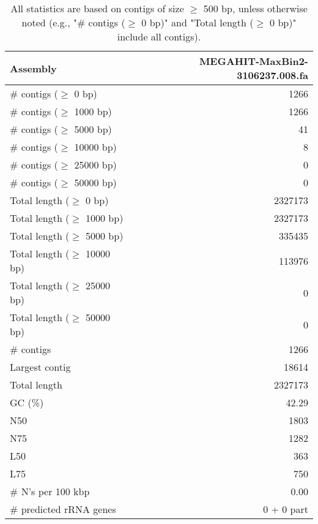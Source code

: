 \documentclass[12pt,a4paper]{article}
\begin{document}
\begin{table}[ht]
\begin{center}
\caption{All statistics are based on contigs of size $\geq$ 500 bp, unless otherwise noted (e.g., "\# contigs ($\geq$ 0 bp)" and "Total length ($\geq$ 0 bp)" include all contigs).}
\begin{tabular}{|l*{1}{|r}|}
\hline
Assembly & MEGAHIT-MaxBin2-3106237.008.fa \\ \hline
\# contigs ($\geq$ 0 bp) & 1266 \\ \hline
\# contigs ($\geq$ 1000 bp) & 1266 \\ \hline
\# contigs ($\geq$ 5000 bp) & 41 \\ \hline
\# contigs ($\geq$ 10000 bp) & 8 \\ \hline
\# contigs ($\geq$ 25000 bp) & 0 \\ \hline
\# contigs ($\geq$ 50000 bp) & 0 \\ \hline
Total length ($\geq$ 0 bp) & 2327173 \\ \hline
Total length ($\geq$ 1000 bp) & 2327173 \\ \hline
Total length ($\geq$ 5000 bp) & 335435 \\ \hline
Total length ($\geq$ 10000 bp) & 113976 \\ \hline
Total length ($\geq$ 25000 bp) & 0 \\ \hline
Total length ($\geq$ 50000 bp) & 0 \\ \hline
\# contigs & 1266 \\ \hline
Largest contig & 18614 \\ \hline
Total length & 2327173 \\ \hline
GC (\%) & 42.29 \\ \hline
N50 & 1803 \\ \hline
N75 & 1282 \\ \hline
L50 & 363 \\ \hline
L75 & 750 \\ \hline
\# N's per 100 kbp & 0.00 \\ \hline
\# predicted rRNA genes & 0 + 0 part \\ \hline
\end{tabular}
\end{center}
\end{table}
\end{document}

